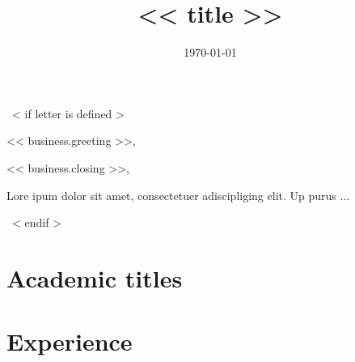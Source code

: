 \documentclass{moderncv}
\title{<< title >>}
\begin{document}
~< if letter is defined >~
\date{\today}
\opening{<< business.greeting >>,} %
\closing{<< business.closing >>,} %

\makelettertitle            %
Lore ipum dolor             %
sit amet, consectetuer
adiscipliging elit.
Up purus ...

\makeletterclosing          %
\newpage
\setcounter{page}{1}
~< endif >~
\maketitle
\section{Academic titles}
\newpage
\section{Experience}
\end{document}
